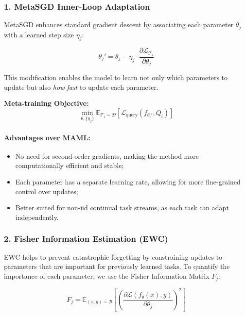 \documentclass[conference]{IEEEtran}
\begin{document}
\subsubsection*{1. MetaSGD Inner-Loop Adaptation}

MetaSGD enhances standard gradient descent by associating each parameter $\theta_j$ with a learned step size $\eta_j$:

\begin{equation}
    \theta_j' = \theta_j - \eta_j \cdot \frac{\partial \mathcal{L}_{\mathcal{T}_i}}{\partial \theta_j}
\end{equation}

This modification enables the model to learn not only which parameters to update but also \textit{how fast} to update each parameter.

\textbf{Meta-training Objective:}
\[
\min_{\theta, \{\eta_j\}} \mathbb{E}_{\mathcal{T}_i \sim \mathcal{D}} \left[ \mathcal{L}_{\text{query}}(f_{\theta_i'}, Q_i) \right]
\]

\paragraph{Advantages over MAML:}
\begin{itemize}
    \item No need for second-order gradients, making the method more computationally efficient and stable;
    \item Each parameter has a separate learning rate, allowing for more fine-grained control over updates;
    \item Better suited for non-iid continual task streams, as each task can adapt independently.
\end{itemize}

\subsubsection*{2. Fisher Information Estimation (EWC)}

EWC helps to prevent catastrophic forgetting by constraining updates to parameters that are important for previously learned tasks. To quantify the importance of each parameter, we use the Fisher Information Matrix $F_j$:

\begin{equation}
F_j = \mathbb{E}_{(x, y) \sim \mathcal{B}} \left[ \left( \frac{\partial \mathcal{L}(f_\theta(x), y)}{\partial \theta_j} \right)^2 \right]
\end{equation}
\end{document}
